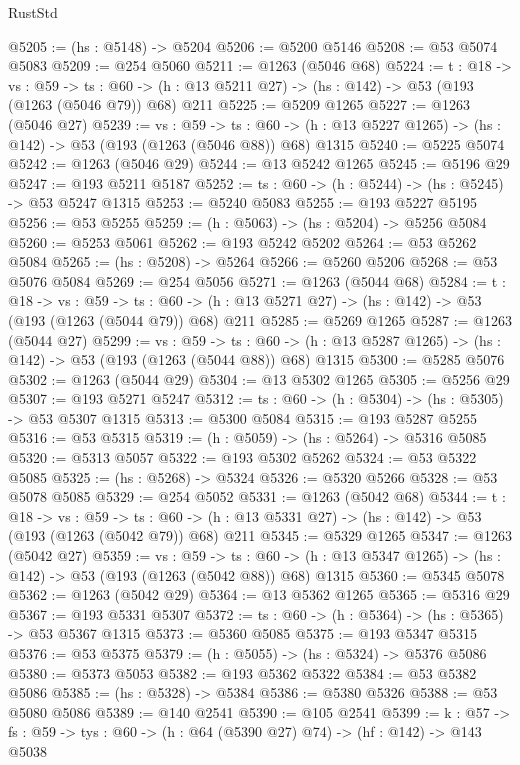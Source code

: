 \begin{lexlean}{RustStd}
\begin{coremodule}
@5205 := (hs : @5148) -> @5204
@5206 := @5200 @5146
@5208 := @53 @5074 @5083
@5209 := @254 @5060
@5211 := @1263 (@5046 @68)
@5224 := {t : @18} ->
  {vs : @59} ->
  {ts : @60} -> (h : @13 @5211 @27) -> (hs : @142) -> @53 (@193 (@1263 (@5046 @79)) @68) @211
@5225 := @5209 @1265
@5227 := @1263 (@5046 @27)
@5239 := {vs : @59} ->
  {ts : @60} -> (h : @13 @5227 @1265) -> (hs : @142) -> @53 (@193 (@1263 (@5046 @88)) @68) @1315
@5240 := @5225 @5074
@5242 := @1263 (@5046 @29)
@5244 := @13 @5242 @1265
@5245 := @5196 @29
@5247 := @193 @5211 @5187
@5252 := {ts : @60} -> (h : @5244) -> (hs : @5245) -> @53 @5247 @1315
@5253 := @5240 @5083
@5255 := @193 @5227 @5195
@5256 := @53 @5255
@5259 := (h : @5063) -> (hs : @5204) -> @5256 @5084
@5260 := @5253 @5061
@5262 := @193 @5242 @5202
@5264 := @53 @5262 @5084
@5265 := (hs : @5208) -> @5264
@5266 := @5260 @5206
@5268 := @53 @5076 @5084
@5269 := @254 @5056
@5271 := @1263 (@5044 @68)
@5284 := {t : @18} ->
  {vs : @59} ->
  {ts : @60} -> (h : @13 @5271 @27) -> (hs : @142) -> @53 (@193 (@1263 (@5044 @79)) @68) @211
@5285 := @5269 @1265
@5287 := @1263 (@5044 @27)
@5299 := {vs : @59} ->
  {ts : @60} -> (h : @13 @5287 @1265) -> (hs : @142) -> @53 (@193 (@1263 (@5044 @88)) @68) @1315
@5300 := @5285 @5076
@5302 := @1263 (@5044 @29)
@5304 := @13 @5302 @1265
@5305 := @5256 @29
@5307 := @193 @5271 @5247
@5312 := {ts : @60} -> (h : @5304) -> (hs : @5305) -> @53 @5307 @1315
@5313 := @5300 @5084
@5315 := @193 @5287 @5255
@5316 := @53 @5315
@5319 := (h : @5059) -> (hs : @5264) -> @5316 @5085
@5320 := @5313 @5057
@5322 := @193 @5302 @5262
@5324 := @53 @5322 @5085
@5325 := (hs : @5268) -> @5324
@5326 := @5320 @5266
@5328 := @53 @5078 @5085
@5329 := @254 @5052
@5331 := @1263 (@5042 @68)
@5344 := {t : @18} ->
  {vs : @59} ->
  {ts : @60} -> (h : @13 @5331 @27) -> (hs : @142) -> @53 (@193 (@1263 (@5042 @79)) @68) @211
@5345 := @5329 @1265
@5347 := @1263 (@5042 @27)
@5359 := {vs : @59} ->
  {ts : @60} -> (h : @13 @5347 @1265) -> (hs : @142) -> @53 (@193 (@1263 (@5042 @88)) @68) @1315
@5360 := @5345 @5078
@5362 := @1263 (@5042 @29)
@5364 := @13 @5362 @1265
@5365 := @5316 @29
@5367 := @193 @5331 @5307
@5372 := {ts : @60} -> (h : @5364) -> (hs : @5365) -> @53 @5367 @1315
@5373 := @5360 @5085
@5375 := @193 @5347 @5315
@5376 := @53 @5375
@5379 := (h : @5055) -> (hs : @5324) -> @5376 @5086
@5380 := @5373 @5053
@5382 := @193 @5362 @5322
@5384 := @53 @5382 @5086
@5385 := (hs : @5328) -> @5384
@5386 := @5380 @5326
@5388 := @53 @5080 @5086
@5389 := @140 @2541
@5390 := @105 @2541
@5399 := {k : @57} ->
  {fs : @59} -> {tys : @60} -> (h : @64 (@5390 @27) @74) -> (hf : @142) -> @143 @5038

\end{coremodule}
\end{lexlean}
